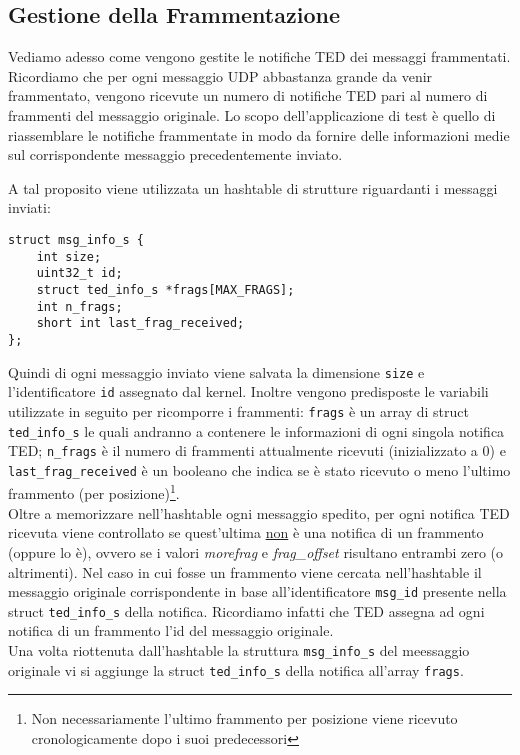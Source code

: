 \documentclass[a4paper,10pt]{article}
\begin{document}
\subsection{Gestione della Frammentazione}
Vediamo adesso come vengono gestite le notifiche TED dei messaggi
frammentati. Ricordiamo che per ogni messaggio UDP abbastanza grande da
venir frammentato, vengono ricevute un numero di notifiche TED pari al
numero di frammenti del messaggio originale. Lo scopo dell'applicazione
di test è quello di riassemblare le notifiche frammentate in modo da
fornire delle informazioni medie sul corrispondente messaggio
precedentemente inviato.

A tal proposito viene utilizzata un hashtable di strutture riguardanti i
messaggi inviati:
\begin{lstlisting}
struct msg_info_s {
	int size;
	uint32_t id;
	struct ted_info_s *frags[MAX_FRAGS];
	int n_frags;
	short int last_frag_received;
};
\end{lstlisting}

Quindi di ogni messaggio inviato viene salvata la dimensione
\texttt{size} e l'identificatore \texttt{id} assegnato dal
kernel. Inoltre vengono predisposte le variabili utilizzate in seguito
per ricomporre i frammenti: \texttt{frags} è un array di struct
\texttt{ted\_info\_s} le quali andranno a contenere le informazioni di
ogni singola notifica TED; \texttt{n\_frags} è il numero di frammenti
attualmente ricevuti (inizializzato a 0) e \texttt{last\_frag\_received}
è un booleano che indica se è stato ricevuto o meno l'ultimo frammento
(per posizione)\footnote{Non necessariamente l'ultimo frammento per
posizione viene ricevuto cronologicamente dopo i suoi predecessori}.\\

Oltre a memorizzare nell'hashtable ogni messaggio spedito, 
per ogni notifica TED ricevuta viene controllato se quest'ultima \underline{non} è
 una
notifica di un frammento (oppure lo è), ovvero se i valori \emph{morefrag}
e \emph{frag\_offset} risultano entrambi zero (o altrimenti).
Nel caso in cui fosse un frammento viene cercata nell'hashtable il
messaggio originale corrispondente in base all'identificatore
\texttt{msg\_id} presente nella struct \texttt{ted\_info\_s} della
notifica. Ricordiamo infatti che TED assegna ad ogni notifica
di un frammento l'id del messaggio originale.\\

Una volta riottenuta dall'hashtable la struttura \texttt{msg\_info\_s} del
meessaggio
originale vi si aggiunge la struct \texttt{ted\_info\_s} della notifica
all'array \texttt{frags}.
\end{document}

